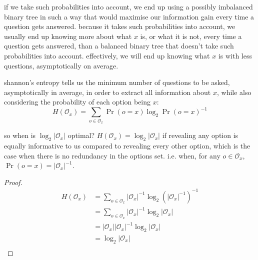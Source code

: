 \documentclass[twocolumn]{article}
\begin{document}
if we take such probabilities into account, we end up using a possibly
imbalanced binary tree in such a way that would maximise our information
gain every time a question gets answered.  because it takes such
probabilities into account, we usually end up knowing more about what $x$
is, or what it is not, every time a question gets answered, than a balanced
binary tree that doesn't take such probabilities into account.
effectively, we will end up knowing what $x$ is with less questions,
asymptotically on average.

shannon's entropy tells us the minimum number of questions to be asked,
asymptotically in average, in order to extract all information about $x$,
while also considering the probability of each option being $x$:
\begin{equation}
    H(\mathcal{O}_x) = \sum_{o \in \mathcal{O}_x}
        \Pr(o=x) \log_2 \Pr(o=x)^{-1}
\end{equation}

so when is $\log_2 |\mathcal{O}_x|$ optimal?  $H(\mathcal{O}_x) = \log_2
|\mathcal{O}_x|$ if revealing any option is equally informative to us
compared to revealing every other option, which is the case when there is
no redundancy in the options set.  i.e. when,  for any $o \in
\mathcal{O}_x$, $\Pr(o=x) = |\mathcal{O}_x|^{-1}$.
\begin{proof}
\begin{equation}
\begin{split}
    H(\mathcal{O}_x)
    &= \sum_{o \in \mathcal{O}_x} |\mathcal{O}_x|^{-1} \log_2
        (|\mathcal{O}_x|^{-1})^{-1} \\
    &= \sum_{o \in \mathcal{O}_x} |\mathcal{O}_x|^{-1} \log_2
        |\mathcal{O}_x| \\
    &= |\mathcal{O}_x| |\mathcal{O}_x|^{-1} \log_2 |\mathcal{O}_x| \\
    &= \log_2 |\mathcal{O}_x| \\
\end{split}
\end{equation}
\end{proof}
\end{document}
